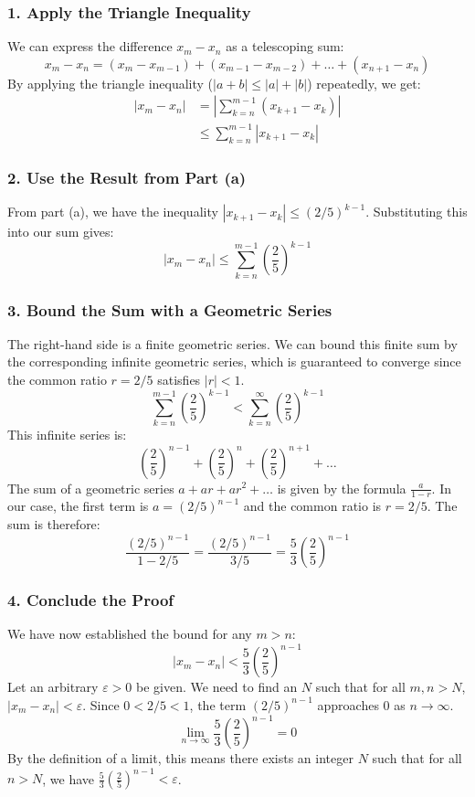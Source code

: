 \documentclass[12pt,a4paper]{article}
\theoremstyle{definition}
\theoremstyle{remark}
\begin{document}
\subsubsection*{1. Apply the Triangle Inequality}
We can express the difference $x_m - x_n$ as a telescoping sum:
\[
x_m - x_n = (x_m - x_{m-1}) + (x_{m-1} - x_{m-2}) + \dots + (x_{n+1} - x_n)
\]
By applying the triangle inequality ($|a+b| \le |a|+|b|$) repeatedly, we get:
\begin{align*}
|x_m - x_n| &= \left| \sum_{k=n}^{m-1} (x_{k+1} - x_k) \right| \\
&\le \sum_{k=n}^{m-1} |x_{k+1} - x_k|
\end{align*}

\subsubsection*{2. Use the Result from Part (a)}
From part (a), we have the inequality $|x_{k+1} - x_k| \le (2/5)^{k-1}$. Substituting this into our sum gives:
\[
|x_m - x_n| \le \sum_{k=n}^{m-1} \left(\frac{2}{5}\right)^{k-1}
\]

\subsubsection*{3. Bound the Sum with a Geometric Series}
The right-hand side is a finite geometric series. We can bound this finite sum by the corresponding infinite geometric series, which is guaranteed to converge since the common ratio $r=2/5$ satisfies $|r|<1$.
\[
\sum_{k=n}^{m-1} \left(\frac{2}{5}\right)^{k-1} < \sum_{k=n}^{\infty} \left(\frac{2}{5}\right)^{k-1}
\]
This infinite series is:
\[
\left(\frac{2}{5}\right)^{n-1} + \left(\frac{2}{5}\right)^{n} + \left(\frac{2}{5}\right)^{n+1} + \dots
\]
The sum of a geometric series $a + ar + ar^2 + \dots$ is given by the formula $\frac{a}{1-r}$.
In our case, the first term is $a = (2/5)^{n-1}$ and the common ratio is $r = 2/5$.
The sum is therefore:
\[
\frac{(2/5)^{n-1}}{1 - 2/5} = \frac{(2/5)^{n-1}}{3/5} = \frac{5}{3} \left(\frac{2}{5}\right)^{n-1}
\]

\subsubsection*{4. Conclude the Proof}
We have now established the bound for any $m > n$:
\[
|x_m - x_n| < \frac{5}{3} \left(\frac{2}{5}\right)^{n-1}
\]
Let an arbitrary $\varepsilon > 0$ be given. We need to find an $N$ such that for all $m, n > N$, $|x_m - x_n| < \varepsilon$.
Since $0 < 2/5 < 1$, the term $(2/5)^{n-1}$ approaches $0$ as $n \to \infty$.
\[
\lim_{n\to\infty} \frac{5}{3} \left(\frac{2}{5}\right)^{n-1} = 0
\]
By the definition of a limit, this means there exists an integer $N$ such that for all $n > N$, we have $\frac{5}{3} \left(\frac{2}{5}\right)^{n-1} < \varepsilon$.
\end{document}
